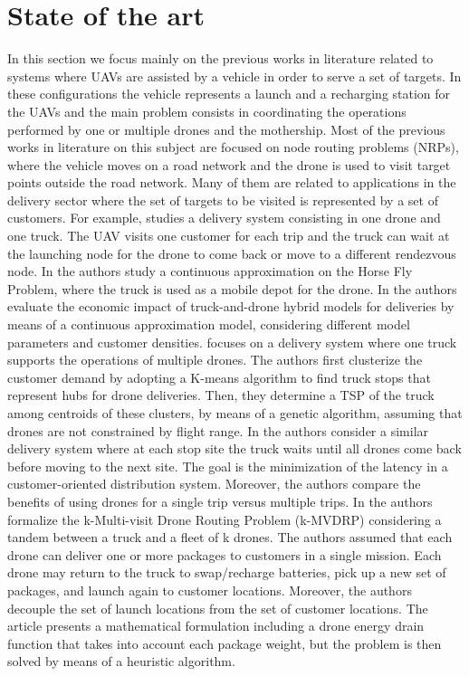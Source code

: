\section{State of the art}
In this section we focus mainly on the previous works in literature related to systems where UAVs are assisted by a vehicle in order to serve a set of targets.
In these configurations the vehicle represents a launch and a recharging station for the UAVs and the main problem consists in coordinating the operations performed by one or multiple drones and the mothership.
Most of the previous works in literature on this subject are focused on node routing problems (NRPs), where the vehicle moves on a road network and the drone is used to visit target points outside the road network. 
Many of them are related to applications in the delivery sector where the set of targets to be visited is represented by a set of customers.
For example, \cite{art:Mathew2015} studies a delivery system consisting in one drone and one truck. The UAV visits one customer for each trip and the truck can wait at the launching node for the drone to come back or move to a different rendezvous node. In \cite{art:Carlsson2018} the authors study a continuous approximation on the Horse Fly Problem, where the truck is used as a mobile depot for the drone. In \cite{art:Campbell2017} the authors evaluate the economic impact of truck-and-drone hybrid models for deliveries by means of a continuous approximation model, considering different model parameters and customer densities. \cite{art:Ferrandez2016} focuses on a delivery system where one truck supports the operations of multiple drones. The authors first clusterize the customer demand by adopting a K-means algorithm to find truck stops that represent hubs for drone deliveries. Then, they determine a TSP of the truck among centroids of these clusters, by means of a genetic algorithm, assuming that drones are not constrained by flight range. In \cite{art:Moshref2017} the authors consider a similar delivery system where at each stop site the truck waits until all drones come back before moving to the next site. The goal is the minimization of the latency in a customer-oriented distribution system. Moreover, the authors compare the benefits of using drones for a single trip versus multiple trips. In \cite{art:Poikonen2020} the authors formalize the k-Multi-visit Drone Routing Problem (k-MVDRP) considering a tandem between a truck and a fleet of k drones. The authors assumed that each drone can deliver one or more packages to customers in a single mission. Each drone may return to the truck to swap/recharge batteries, pick up a new set of packages, and launch again to customer locations. Moreover, the authors decouple the set of launch locations from the set of customer locations. The article presents a mathematical formulation including a drone energy drain function that takes into account each package weight, but the problem is then solved by means of a heuristic algorithm.
